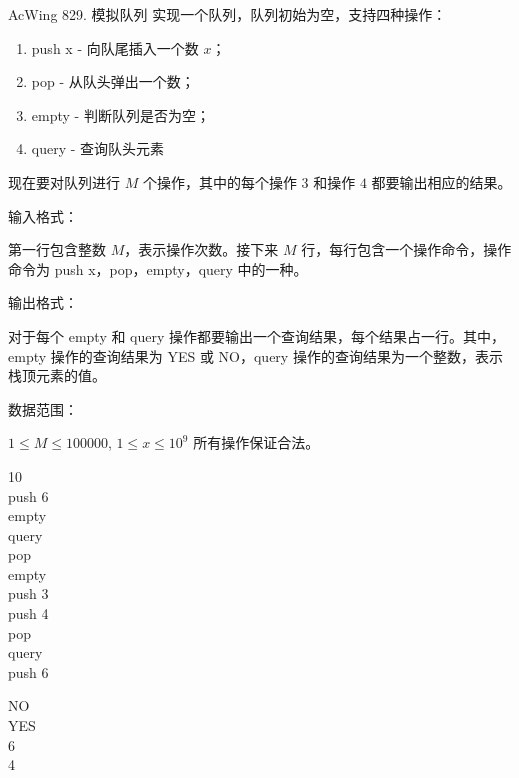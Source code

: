 \begin{titledbox}{AcWing 829. 模拟队列}
实现一个队列，队列初始为空，支持四种操作：

\begin{enumerate}
    \itemsep=-5pt
    \item push x - 向队尾插入一个数 $x$；
    \item pop - 从队头弹出一个数；
    \item empty - 判断队列是否为空；
    \item query - 查询队头元素
\end{enumerate}

现在要对队列进行 $M$ 个操作，其中的每个操作 $3$ 和操作 $4$ 都要输出相应的结果。

输入格式：

第一行包含整数 $M$，表示操作次数。接下来 $M$ 行，每行包含一个操作命令，操作命令为 push x，pop，empty，query 中的一种。

输出格式：

对于每个 empty 和 query 操作都要输出一个查询结果，每个结果占一行。其中，empty 操作的查询结果为 YES 或 NO，query 操作的查询结果为一个整数，表示栈顶元素的值。

数据范围：

$1 \le M \le 100000$, $1 \le x \le 10^9$ 所有操作保证合法。

\begin{inputblock}
    10 \\
    push 6 \\
    empty \\
    query \\
    pop \\
    empty \\
    push 3 \\
    push 4 \\
    pop \\
    query \\
    push 6
\end{inputblock}
\begin{outputblock}
    NO \\
    YES \\
    6 \\
    4
\end{outputblock}
\end{titledbox}

